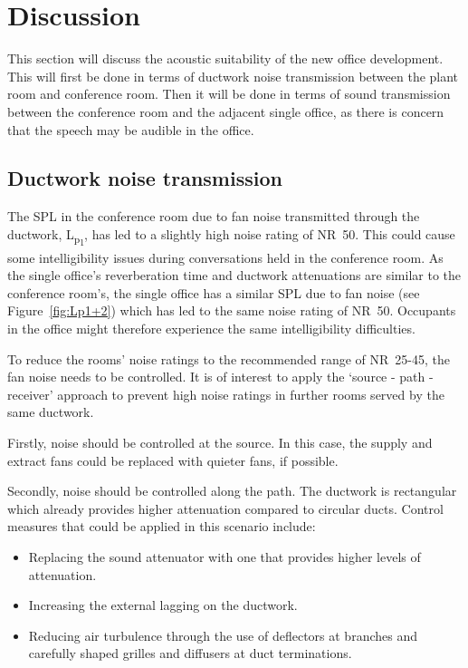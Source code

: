 \section{Discussion}

This section will discuss the acoustic suitability of the new office development.
This will first be done in terms of ductwork noise transmission between the plant room and conference room.
Then it will be done in terms of sound transmission between the conference room and the adjacent single office, as there is concern that the speech may be audible in the office.



\subsection{Ductwork noise transmission} \label{sec:disc_BN}


The SPL in the conference room due to fan noise transmitted through the ductwork, L\textsubscript{p\textsubscript{1}}, has led to a slightly high noise rating of NR~50.
This could cause some intelligibility issues during conversations held in the conference room.
As the single office's reverberation time and ductwork attenuations are similar to the conference room's, the single office has a similar SPL due to fan noise (see Figure~\ref{fig:Lp1+2}) which has led to the same noise rating of NR~50.
Occupants in the office might therefore experience the same intelligibility difficulties.

To reduce the rooms' noise ratings to the recommended range of NR~25-45, the fan noise needs to be controlled.
It is of interest to apply the `source - path - receiver' approach to prevent high noise ratings in further rooms served by the same ductwork.

Firstly, noise should be controlled at the source.
In this case, the supply and extract fans could be replaced with quieter fans, if possible.

Secondly, noise should be controlled along the path.
The ductwork is rectangular which already provides higher attenuation compared to circular ducts.
Control measures that could be applied in this scenario include:
\begin{itemize}
	\item Replacing the sound attenuator with one that provides higher levels of attenuation.
	\item Increasing the external lagging on the ductwork.
	\item Reducing air turbulence through the use of deflectors at branches and carefully shaped grilles and diffusers at duct terminations.
\end{itemize}

